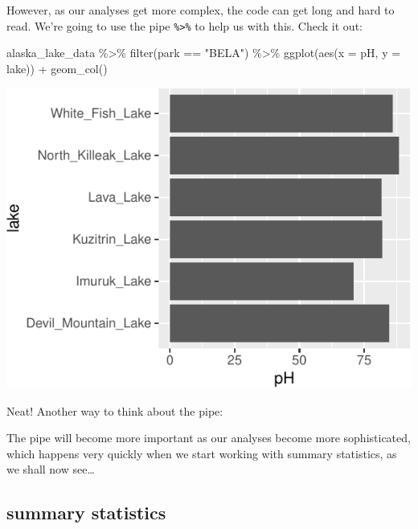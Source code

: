 \documentclass[
]{krantz}
\newenvironment{Shaded}{\begin{snugshade}}{\end{snugshade}}
\newcommand{\AttributeTok}[1]{\textcolor[rgb]{0.77,0.63,0.00}{#1}}
\newcommand{\FunctionTok}[1]{\textcolor[rgb]{0.00,0.00,0.00}{#1}}
\newcommand{\NormalTok}[1]{#1}
\newcommand{\SpecialCharTok}[1]{\textcolor[rgb]{0.00,0.00,0.00}{#1}}
\newcommand{\StringTok}[1]{\textcolor[rgb]{0.31,0.60,0.02}{#1}}
\begin{document}
However, as our analyses get more complex, the code can get long and hard to read. We're going to use the pipe \texttt{\%\textgreater{}\%} to help us with this. Check it out:

\begin{Shaded}
\begin{Highlighting}[]
\NormalTok{alaska\_lake\_data }\SpecialCharTok{\%\textgreater{}\%}
  \FunctionTok{filter}\NormalTok{(park }\SpecialCharTok{==} \StringTok{"BELA"}\NormalTok{) }\SpecialCharTok{\%\textgreater{}\%}
  \FunctionTok{ggplot}\NormalTok{(}\FunctionTok{aes}\NormalTok{(}\AttributeTok{x =}\NormalTok{ pH, }\AttributeTok{y =}\NormalTok{ lake)) }\SpecialCharTok{+} \FunctionTok{geom\_col}\NormalTok{()}
\end{Highlighting}
\end{Shaded}

\begin{center}\includegraphics[width=1\linewidth]{index_files/figure-latex/unnamed-chunk-73-1} \end{center}

Neat! Another way to think about the pipe:

The pipe will become more important as our analyses become more sophisticated, which happens very quickly when we start working with summary statistics, as we shall now see\ldots{}

\hypertarget{summary-statistics}{%
\subsection{summary statistics}\label{summary-statistics}}
\end{document}
